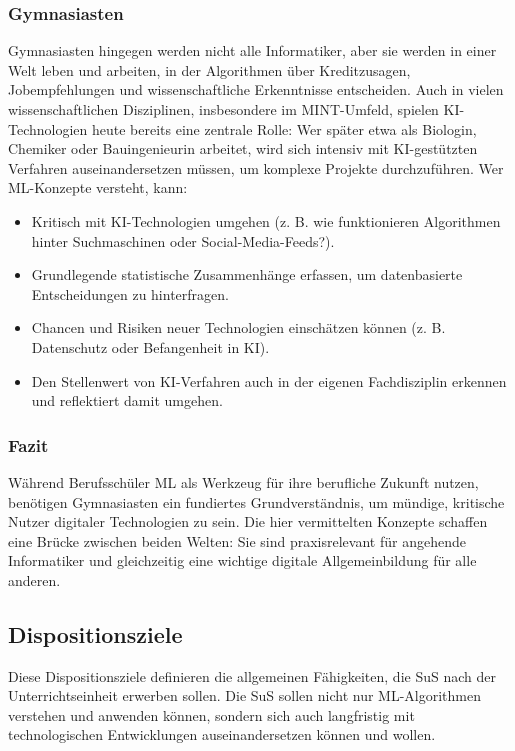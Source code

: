 \documentclass[twocolumn]{article}
\begin{document}
\subsubsection{Gymnasiasten}
\label{sec:leitideegymi}

Gymnasiasten hingegen werden nicht alle Informatiker, aber sie werden in einer Welt leben und arbeiten, in der Algorithmen über Kreditzusagen, Jobempfehlungen und wissenschaftliche Erkenntnisse entscheiden. Auch in vielen wissenschaftlichen Disziplinen, insbesondere im MINT-Umfeld, spielen KI-Technologien heute bereits eine zentrale Rolle: Wer später etwa als Biologin, Chemiker oder Bauingenieurin arbeitet, wird sich intensiv mit KI-gestützten Verfahren auseinandersetzen müssen, um komplexe Projekte durchzuführen. Wer ML-Konzepte versteht, kann:

\begin{itemize}[itemsep=0.3em, parsep=0pt, topsep=1em]
   \item Kritisch mit KI-Technologien umgehen (z. B. wie funktionieren Algorithmen hinter Suchmaschinen oder Social-Media-Feeds?).
   \item Grundlegende statistische Zusammenhänge erfassen, um datenbasierte Entscheidungen zu hinterfragen.
   \item Chancen und Risiken neuer Technologien einschätzen können (z. B. Datenschutz oder Befangenheit in KI).
   \item Den Stellenwert von KI-Verfahren auch in der eigenen Fachdisziplin erkennen und reflektiert damit umgehen.
\end{itemize}

\subsubsection{Fazit}

Während Berufsschüler ML als Werkzeug für ihre berufliche Zukunft nutzen, benötigen Gymnasiasten ein fundiertes Grundverständnis, um mündige, kritische Nutzer digitaler Technologien zu sein. Die hier vermittelten Konzepte schaffen eine Brücke zwischen beiden Welten: Sie sind praxisrelevant für angehende Informatiker und gleichzeitig eine wichtige digitale Allgemeinbildung für alle anderen.


\subsection{Dispositionsziele}
\label{sec:dispziele}

Diese Dispositionsziele definieren die allgemeinen Fähigkeiten, die SuS nach der Unterrichtseinheit erwerben sollen. Die SuS sollen nicht nur ML-Algorithmen verstehen und anwenden können, sondern sich auch langfristig mit technologischen Entwicklungen auseinandersetzen können und wollen.  
\end{document}
